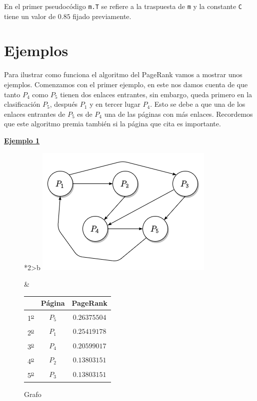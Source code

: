 \documentclass[size=a4, parskip=half, titlepage=false, toc=flat, toc=bib, 12pt]{scrartcl}
\theoremstyle{theorem-style}
\theoremstyle{definition-style}
\theoremstyle{remark-style}
\theoremstyle{example-style}
\theoremstyle{definition-style}
\theoremstyle{remark-style}
\begin{document}
En el primer pseudocódigo \verb|m.T| se refiere a la traspuesta de \verb|m| y la constante \verb|C| tiene un valor de $0.85$ fijado previamente.

\newpage

\section{Ejemplos}
Para ilustrar como funciona el algoritmo del PageRank vamos a mostrar unos ejemplos. Comenzamos con el primer ejemplo, en este nos damos cuenta de que tanto $P_4$ como $P_5$ tienen dos enlaces entrantes, sin embargo, queda primero en la clasificación $P_5$, después $P_1$ y en tercer lugar $P_4$. Esto se debe a que una de los enlaces entrantes de $P_5$ es de $P_4$ una de las páginas con más enlaces. Recordemos que este algoritmo premia también si la página que cita es importante.

\underline{\textbf{Ejemplo 1}}

\begin{figure}[!ht]
  \begin{tabular}{*{2}{>{\centering\arraybackslash}b{}}}
  \centering
    \includegraphics[scale=0.5]{./img/grafoej1}
    \caption{Grafo}
    &
      \renewcommand{\arraystretch}{1.3}
      \begin{tabular}{ccc}
         & Página & PageRank     \\ \hline
      1\textsuperscript{\underline{o}}} & $P_5$  & $0.26375504$ \\ \hline
      2\textsuperscript{\underline{o}}} & $P_1$  & $0.25419178$ \\ \hline
      3\textsuperscript{\underline{o}}} & $P_4$  & $0.20599017$ \\ \hline
      4\textsuperscript{\underline{o}}} & $P_2$  & $0.13803151$ \\ \hline
      5\textsuperscript{\underline{o}}} & $P_3$  & $0.13803151$ \\ \hline
      \end{tabular}
  \end{tabular}
\end{figure}
\end{document}
